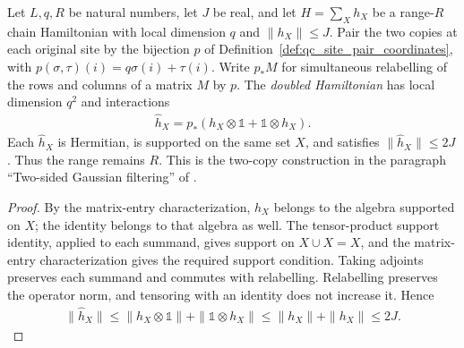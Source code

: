 \begin{definition}
    \label{def:chain_doubled_hamiltonian}
    \leanok
    Let $L,q,R$ be natural numbers, let $J$ be real, and let
    $H=\sum_X h_X$ be a range-$R$ chain Hamiltonian with local dimension $q$
    and $\|h_X\|\le J$. Pair the two copies at each original site by the
    bijection $p$ of Definition~\ref{def:qc_site_pair_coordinates}, with
    $p(\sigma,\tau)(i)=q\sigma(i)+\tau(i)$. Write $p_*M$ for simultaneous
    relabelling of the rows and columns of a matrix $M$ by $p$. The
    \emph{doubled Hamiltonian} has local dimension $q^2$ and interactions
    \begin{align}
        \widehat h_X=p_*(h_X\otimes\mathbb 1+\mathbb 1\otimes h_X).
    \end{align}
    Each $\widehat h_X$ is Hermitian, is supported on the same set $X$, and
    satisfies $\|\widehat h_X\|\le2J$. Thus the range remains $R$.
    This is the two-copy construction in the paragraph ``Two-sided Gaussian
    filtering'' of \cite{TNLean2026OneDimensional}.
\end{definition}
\begin{proof}
    \leanok
    By the matrix-entry characterization, $h_X$ belongs to the algebra
    supported on $X$; the identity belongs to that algebra as well. The tensor-product support identity,
    applied to each summand, gives support on $X\cup X=X$, and the
    matrix-entry characterization gives the required support condition.
    Taking adjoints preserves each summand and commutes with relabelling.
    Relabelling preserves the operator norm, and tensoring with an identity
    does not increase it. Hence
    \begin{align}
        \|\widehat h_X\|
        \le\|h_X\otimes\mathbb 1\|+\|\mathbb 1\otimes h_X\|
        \le\|h_X\|+\|h_X\|\le2J.
    \end{align}
\end{proof}

